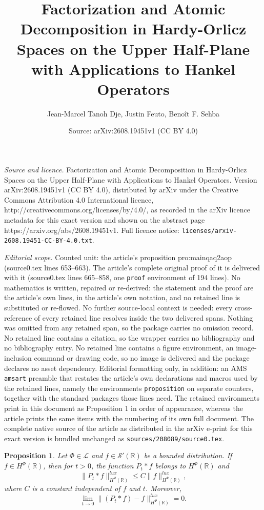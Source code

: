 \documentclass[10pt,a4paper]{amsart}
\title{Factorization and Atomic Decomposition in Hardy-Orlicz Spaces on the Upper Half-Plane with Applications to Hankel Operators}
\author{Jean-Marcel Tanoh Dje, Justin Feuto, Beno\^it F. Sehba}
\date{Source: arXiv:2608.19451v1 (CC BY 4.0)}
\newtheorem{proposition}{Proposition}
\begin{document}
\maketitle

\noindent\emph{Source and licence.} Factorization and Atomic Decomposition in Hardy-Orlicz Spaces on the Upper Half-Plane with Applications to Hankel Operators. Version arXiv:2608.19451v1 (CC BY 4.0), distributed by arXiv under the Creative Commons Attribution 4.0 International licence, http://creativecommons.org/licenses/by/4.0/, as recorded in the arXiv licence metadata for this exact version and shown on the abstract page https://arxiv.org/abs/2608.19451v1. Full licence notice: \texttt{licenses/arxiv-2608.19451-CC-BY-4.0.txt}.\par\smallskip

\noindent\textit{Editorial scope.} Counted unit: the article's proposition pro:mainqaq2aop (source0.tex lines 653--663). The article's complete original proof of it is delivered with it (source0.tex lines 665--858, one \texttt{proof} environment of 194 lines). No mathematics is written, repaired or re-derived: the statement and the proof are the article's own lines, in the article's own notation, and no retained line is substituted or re-flowed.  No further source-local context is needed: every cross-reference of every retained line resolves inside the two delivered spans.  Nothing was omitted from any retained span, so the package carries no omission record.  No retained line contains a citation, so the wrapper carries no bibliography and no bibliography entry.  No retained line contains a figure environment, an image-inclusion command or drawing code, so no image is delivered and the package declares no asset dependency.  Editorial formatting only, in addition: an AMS \texttt{amsart} preamble that restates the article's own declarations and macros used by the retained lines, namely the environments \texttt{proposition} on separate counters, together with the standard packages those lines need.  The retained environments print in this document as Proposition 1 in order of appearance, whereas the article prints the same items with the numbering of its own full document.  The complete native source of the article as distributed in the arXiv e-print for this exact version is bundled unchanged as \texttt{sources/208089/source0.tex}.
\begin{proposition}\label{pro:mainqaq2aop}
Let  $\Phi \in \mathscr{L}$ and $f \in \mathscr{S}'(\mathbb{R})$ be a bounded distribution. 
If $f \in H^{\Phi}(\mathbb{R})$, then for $t>0$, the function $P_{t}\ast f$ belongs to $H^{\Phi}(\mathbb{R})$ and 
\begin{equation}\label{eq:pmta2}
\|P_{t}\ast f\|_{H^{\Phi}(\mathbb{R})}^{lux} \leq C \|f\|_{H^{\Phi}(\mathbb{R})}^{lux},
\end{equation}
where $C$ is a constant independent of $f$ and $t$. Moreover,
\begin{equation}\label{eq:dqtaqa2}
\lim_{t \to 0}\|(P_{t}\ast f)-f\|_{H^{\Phi}(\mathbb{R})}^{lux}=0.
\end{equation}
\end{proposition}
\end{document}
